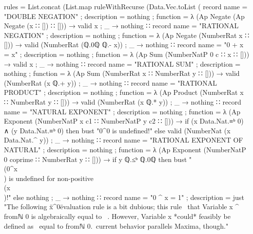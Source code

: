 \documentclass{report}
\begin{document}
\begin{code}
    rules = List.concat (List.map ruleWithRecurse (Data.Vec.toList
      ( record
          { name = "DOUBLE NEGATION"
          ; description = nothing
          ; function =
            λ { (Ap Negate (Ap Negate (x ∷ []) ∷ [])) → valid x
              ; _ → nothing}
          }
      ∷ record
          { name = "RATIONAL NEGATION"
          ; description = nothing
          ; function =
            λ { (Ap Negate (NumberRat x ∷ [])) → valid (NumberRat (ℚ.0ℚ ℚ.- x))
              ; _ → nothing}
          }
      ∷ record
          { name = "0 + x = x"
          ; description = nothing
          ; function =
            λ { (Ap Sum (NumberNatP 0 c ∷ x ∷ [])) → valid x
              ; _ → nothing}
          }
      ∷ record
          { name = "RATIONAL SUM"
          ; description = nothing
          ; function =
            λ { (Ap Sum (NumberRat x ∷ NumberRat y ∷ [])) →
                valid (NumberRat (x ℚ.+ y))
              ; _ → nothing}
          }
      ∷ record
          { name = "RATIONAL PRODUCT"
          ; description = nothing
          ; function =
            λ { (Ap Product (NumberRat x ∷ NumberRat y ∷ [])) →
                valid (NumberRat (x ℚ.* y))
              ; _ → nothing}
          }
      ∷ record
          { name = "NATURAL EXPONENT"
          ; description = nothing
          ; function =
            λ { (Ap Exponent (NumberNatP x c1 ∷ NumberNatP y c2 ∷ [])) →
                if (x Data.Nat.≡ᵇ 0) ∧ (y Data.Nat.≡ᵇ 0)
                  then bust "0^0 is undefined!"
                  else valid (NumberNat (x Data.Nat.^ y))
              ; _ → nothing}
          }
      ∷ record
          { name = "RATIONAL EXPONENT OF NATURAL"
          ; description = nothing
          ; function =
            λ { (Ap Exponent (NumberNatP 0 coprime ∷ NumberRat y ∷ [])) →
                if y ℚ.≤ᵇ ℚ.0ℚ
                   then bust "\\(0^x\\) is undefined for non-positive \\(x\\)!"
                   else nothing
              ; _ → nothing}
          }
      ∷ record
          { name = "0 ^ x = 1"
          ; description = just
            "The following \"x^0\" evaluation rule is a bit dubious; this rule \
            \indicates that Variable x ^ fromℕ 0 is algebraically equal to \
            .  However, Variable x *could* feasibly be defined as \
            \being equal to fromℕ 0.\n\
            \The current behavior parallels Maxima, though."
}
\end{code}
\end{document}
